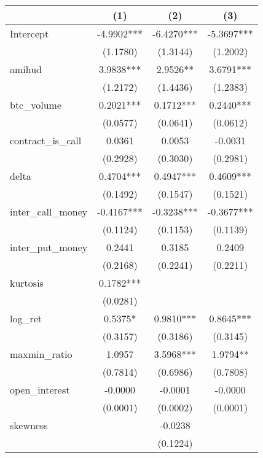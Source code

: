 \begin{tabular}{lccc}
\hline
                   &    (1)     &    (2)     &     (3)      \\
\midrule
\midrule
Intercept          & -4.9902*** & -6.4270*** & -5.3697***   \\
                   & (1.1780)   & (1.3144)   & (1.2002)     \\
amihud             & 3.9838***  & 2.9526**   & 3.6791***    \\
                   & (1.2172)   & (1.4436)   & (1.2383)     \\
btc\_volume        & 0.2021***  & 0.1712***  & 0.2440***    \\
                   & (0.0577)   & (0.0641)   & (0.0612)     \\
contract\_is\_call & 0.0361     & 0.0053     & -0.0031      \\
                   & (0.2928)   & (0.3030)   & (0.2981)     \\
delta              & 0.4704***  & 0.4947***  & 0.4609***    \\
                   & (0.1492)   & (0.1547)   & (0.1521)     \\
inter\_call\_money & -0.4167*** & -0.3238*** & -0.3677***   \\
                   & (0.1124)   & (0.1153)   & (0.1139)     \\
inter\_put\_money  & 0.2441     & 0.3185     & 0.2409       \\
                   & (0.2168)   & (0.2241)   & (0.2211)     \\
kurtosis           & 0.1782***  &            &              \\
                   & (0.0281)   &            &              \\
log\_ret           & 0.5375*    & 0.9810***  & 0.8645***    \\
                   & (0.3157)   & (0.3186)   & (0.3145)     \\
maxmin\_ratio      & 1.0957     & 3.5968***  & 1.9794**     \\
                   & (0.7814)   & (0.6986)   & (0.7808)     \\
open\_interest     & -0.0000    & -0.0001    & -0.0000      \\
                   & (0.0001)   & (0.0002)   & (0.0001)     \\
skewness           &            & -0.0238    &              \\
                   &            & (0.1224)   &              \\

\end{tabular}
